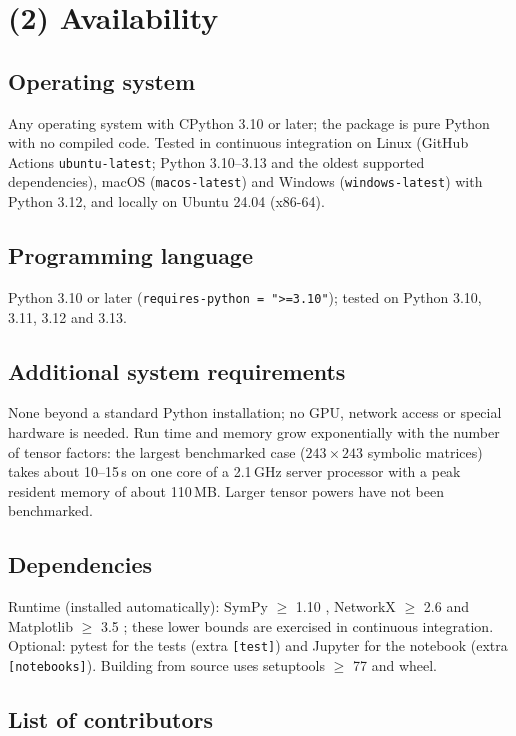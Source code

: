 \documentclass[11pt,a4paper]{article}
\newcommand{\code}[1]{\texttt{#1}}
\begin{document}
\section*{(2) Availability}

\subsection*{Operating system}

Any operating system with CPython 3.10 or later; the package is pure Python with no compiled code. Tested in continuous integration on Linux (GitHub Actions \code{ubuntu-latest}; Python 3.10--3.13 and the oldest supported dependencies), macOS (\code{macos-latest}) and Windows (\code{windows-latest}) with Python 3.12, and locally on Ubuntu 24.04 (x86-64).

\subsection*{Programming language}

Python 3.10 or later (\code{requires-python = ">=3.10"}); tested on Python 3.10, 3.11, 3.12 and 3.13.

\subsection*{Additional system requirements}

None beyond a standard Python installation; no GPU, network access or special hardware is needed. Run time and memory grow exponentially with the number of tensor factors: the largest benchmarked case ($243\times243$ symbolic matrices) takes about 10--15\,s on one core of a 2.1\,GHz server processor with a peak resident memory of about 110\,MB. Larger tensor powers have not been benchmarked.

\subsection*{Dependencies}

Runtime (installed automatically): SymPy $\geq$ 1.10 \cite{meurer2017sympy}, NetworkX $\geq$ 2.6 \cite{hagberg2008networkx} and Matplotlib $\geq$ 3.5 \cite{hunter2007matplotlib}; these lower bounds are exercised in continuous integration. Optional: pytest for the tests (extra \code{[test]}) and Jupyter for the notebook (extra \code{[notebooks]}). Building from source uses setuptools $\geq$ 77 and wheel.

\subsection*{List of contributors}
\end{document}
